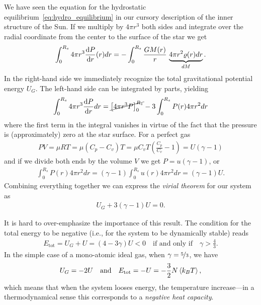 We have seen the equation for the hydrostatic equilibrium~\eqref{eq:hydro_equilibrium}
in our cursory description of the inner structure of the Sun. If we multiply by
$4\pi r^3$ both sides and integrate over the radial coordinate from the center to
the surface of the star we get
\begin{align*}
  \int_0^{R_s} 4\pi r^3 \dv{P}{r}{(r)} dr =
  -\int_0^{R_s} \frac{GM(r)}{r} \, \underbrace{4\pi r^2 \varrho(r) dr}_{dM}.
\end{align*}
In the right-hand side we immediately recognize the total gravitational potential
energy $U_G$. The left-hand side can be integrated by parts, yielding
\begin{align*}
  \int_0^{R_s} 4\pi r^3 \dv{P}{r} dr =
  \cancel{\left[ 4\pi r^3 P \right]_0^{R_s}} - 3 \int_0^{R_s} P(r) 4\pi r^2 dr
\end{align*}
where the first term in the integral vanishes in virtue of the fact that the pressure
is (approximately) zero at the star surface. For a perfect gas
\begin{align*}
  PV = \mu RT = \mu (C_p - C_v)T =
  \mu C_v T \left( \frac{C_p}{C_v} - 1 \right) = U (\gamma - 1)
\end{align*}
and if we divide both ends by the volume $V$ we get $P = u (\gamma - 1)$, or
\begin{align*}
  \int_0^{R_s} P(r) 4\pi r^2 dr = (\gamma - 1) \int_0^{R_s} u(r) 4\pi r^2 dr =
  (\gamma - 1) U.
\end{align*}
Combining everything together we can express the \emph{virial theorem} for our system
as
\begin{align}
  U_G + 3 (\gamma - 1) U = 0.
\end{align}

It is hard to over-emphasize the importance of this result. The condition for the
total energy to be negative (i.e., for the system to be dynamically stable) reads
\begin{align*}
  E_\text{tot} = U_G + U = (4 - 3\gamma) U < 0 \quad\text{if and only if}\quad \gamma > \frac{4}{3}.
\end{align*}
In the simple case of a mono-atomic ideal gas, when $\gamma = \nicefrac{5}{3}$,
we have
\begin{align}
  U_G = - 2U \quad\text{and}\quad E_\text{tot} = - U = -\frac{3}{2} N \left<k_B T\right>,
\end{align}
which means that when the system looses energy, the temperature increase---in a
thermodynamical sense this corresponds to a \emph{negative heat capacity}.

